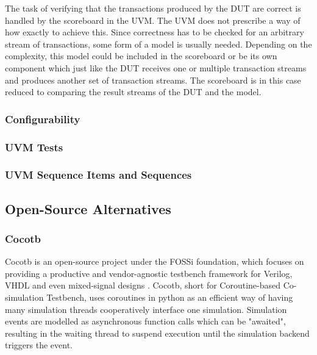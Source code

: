 \documentclass[12pt]{report}
\begin{document}
The task of verifying that the transactions produced by the DUT are correct is handled by the scoreboard in the UVM.
The UVM does not prescribe a way of how exactly to achieve this. Since correctness has to be checked for an arbitrary
stream of transactions, some form of a model is usually needed. Depending on the complexity, this model could be
included in the scoreboard or be its own component which just like the DUT receives one or multiple transaction
streams and produces another set of transaction streams. The scoreboard is in this case reduced to comparing the
result streams of the DUT and the model.

\subsubsection{Configurability} %

\subsubsection{UVM Tests} %

\subsubsection{UVM Sequence Items and Sequences} %

\subsection{Open-Source Alternatives} %

\subsubsection{Cocotb} %

Cocotb is an open-source project under the FOSSi foundation, which focuses on providing a productive and
vendor-agnostic testbench framework for Verilog, VHDL and even mixed-signal designs \cite{cocotb}. Cocotb, short for
Coroutine-based Co-simulation Testbench, uses coroutines in python as an efficient way of having many simulation
threads cooperatively interface one simulation. Simulation events are modelled as asynchronous function calls which
can be "awaited", resulting in the waiting thread to suspend execution until the simulation backend triggers the event.
\end{document}
